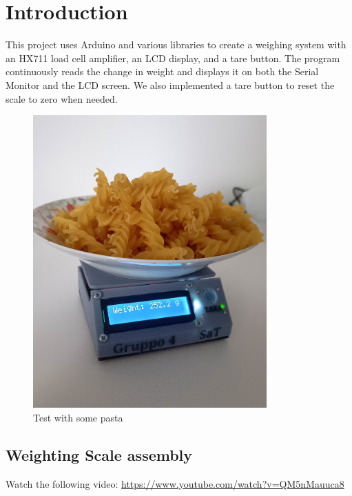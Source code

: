 
  \section{Introduction}
This project uses Arduino and various libraries to create a weighing system with an HX711 load cell amplifier, an LCD display, and a tare button. The program continuously reads the change in weight and displays it on both the Serial Monitor and the LCD screen. We also implemented a tare button to reset the scale to zero when needed.



\begin{figure}[H]
    \centering
    \includegraphics[width=0.8\textwidth]{medias/photos/test1.jpg}
    \caption{Test with some pasta}
    \label{fig:immagine}
\end{figure}

\subsection{Weighting Scale assembly}

Watch the following video:
\url{https://www.youtube.com/watch?v=QM5nMauuca8}

